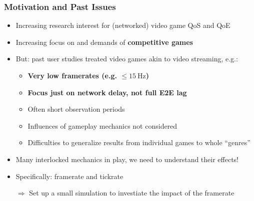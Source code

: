\documentclass{UDEbeamerEN}
\begin{document}
\begin{frame}
	\frametitle{Motivation and Past Issues}

	\begin{itemize}
		\item Increasing research interest for (networked) video game QoS and QoE
		\item Increasing focus on and demands of \textbf{competitive games}
		\item But: past user studies treated video games akin to video streaming, e.g.:
			\pause
			\begin{itemize}
				\item \textbf{Very low framerates (e.g. $\leq \SI{15}{\hertz}$)}
				\item \textbf{Focus just on network delay, not full E2E lag}
				\item Often short observation periods
				\item Influences of gameplay mechanics not considered
				\item Difficulties to generalize results from individual games to whole ``genres''
			\end{itemize}

		\pause
		\item Many interlocked mechanics in play, we need to understand their effects!
		\item Specifically: framerate and tickrate
		\item[$\Rightarrow$] Set up a small simulation to investiate the impact of the framerate
	\end{itemize}

\end{frame}
\end{document}
